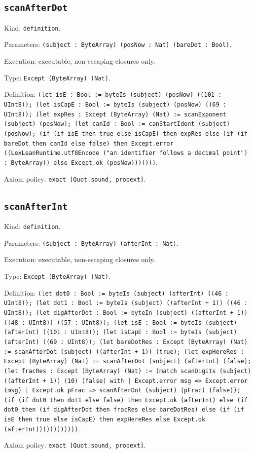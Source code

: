 \documentclass[11pt]{article}
\begin{document}
\subsection*{\texttt{scanAfterDot}}
\noindent Kind: \texttt{definition}.\par
\noindent Parameters: \texttt{(subject : ByteArray) (posNow : Nat) (bareDot : Bool)}.\par
\noindent Execution: executable, non-escaping closures only.\par
\noindent Type: \texttt{Except (ByteArray) (Nat)}.\par
\noindent Definition: \texttt{(let isE : Bool := byteIs (subject) (posNow) ((101 : UInt8)); (let isCapE : Bool := byteIs (subject) (posNow) ((69 : UInt8)); (let expRes : Except (ByteArray) (Nat) := scanExponent (subject) (posNow); (let canId : Bool := canStartIdent (subject) (posNow); (if (if isE then true else isCapE) then expRes else (if (if bareDot then canId else false) then Except.error ((LexLeanRuntime.utf8Encode ("an identifier follows a decimal point") : ByteArray)) else Except.ok (posNow)))))))}.\par
\noindent Axiom policy: \texttt{exact [Quot.sound, propext]}.\par
\subsection*{\texttt{scanAfterInt}}
\noindent Kind: \texttt{definition}.\par
\noindent Parameters: \texttt{(subject : ByteArray) (afterInt : Nat)}.\par
\noindent Execution: executable, non-escaping closures only.\par
\noindent Type: \texttt{Except (ByteArray) (Nat)}.\par
\noindent Definition: \texttt{(let dot0 : Bool := byteIs (subject) (afterInt) ((46 : UInt8)); (let dot1 : Bool := byteIs (subject) ((afterInt + 1)) ((46 : UInt8)); (let digAfterDot : Bool := byteIn (subject) ((afterInt + 1)) ((48 : UInt8)) ((57 : UInt8)); (let isE : Bool := byteIs (subject) (afterInt) ((101 : UInt8)); (let isCapE : Bool := byteIs (subject) (afterInt) ((69 : UInt8)); (let bareDotRes : Except (ByteArray) (Nat) := scanAfterDot (subject) ((afterInt + 1)) (true); (let expHereRes : Except (ByteArray) (Nat) := scanAfterDot (subject) (afterInt) (false); (let fracRes : Except (ByteArray) (Nat) := (match scanDigits (subject) ((afterInt + 1)) (10) (false) with | Except.error msg => Except.error (msg) | Except.ok pFrac => scanAfterDot (subject) (pFrac) (false)); (if (if dot0 then dot1 else false) then Except.ok (afterInt) else (if dot0 then (if digAfterDot then fracRes else bareDotRes) else (if (if isE then true else isCapE) then expHereRes else Except.ok (afterInt))))))))))))}.\par
\noindent Axiom policy: \texttt{exact [Quot.sound, propext]}.\par
\end{document}
